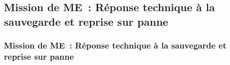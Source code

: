 \subsection{Mission de ME~: Réponse technique à la sauvegarde et reprise sur panne}
\begin{frame}
	\frametitle{Mission de ME~: Réponse technique à la sauvegarde et reprise sur panne}
\end{frame}

